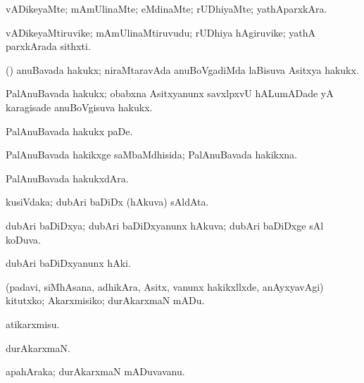 {{{\bentry
{} 
\gl{\kirxvi}
\expl{}
\bmng
vADikeyaMte; mAmUlinaMte; eMdinaMte; rUDhiyaMte; yathAparxkAra. 
\emng
\eentry

\bentry
{} 
\gl{\nA}
\expl{}
\bmng
vADikeyaMtiruvike; mAmUlinaMtiruvudu; rUDhiya hAgiruvike; yathA parxkArada sithxti. 
\emng
\eentry

\bentry
{} 
\gl{\nA}
\expl{}
\bmng
{} 
\emng
\eentry

\bentry
{} 
\gl{\nA}
\expl{}
\bmng
(\nAyxshA) anuBavada hakukx; niraMtaravAda anuBoVgadiMda laBisuva Asitxya hakukx. 
\emng
\eentry

\bentry
{} 
\gl{\nA}
\expl{}
\bmng
PalAnuBavada hakukx; obabxna Asitxyanunx savxlpxvU hALumADade yA karagisade anuBoVgisuva hakukx. 
\emng
\eentry

\bentry
{} 
\gl{\sakirx}
\expl{}
\bmng
PalAnuBavada hakukx paDe. 
\emng
\eentry

\bentry
{} 
\gl{\gu}
\expl{}
\bmng
PalAnuBavada hakikxge saMbaMdhisida; PalAnuBavada hakikxna. 
\emng
\eentry

\bentry
{} 
\gl{\nA}
\expl{}
\bmng
PalAnuBavada hakukxdAra. 
\emng
\eentry

\bentry
{} 
\gl{\nA}
\expl{}
\bmng
kusiVdaka; dubAri baDiDx (hAkuva) sAldAta. 
\emng
\eentry

\bentry
{} 
\gl{\gu}
\expl{}
\bmng
dubAri baDiDxya; dubAri baDiDxyanunx hAkuva; dubAri baDiDxge sAl koDuva. 
\emng
\eentry

\bentry
{} 
\gl{\kirxvi}
\expl{}
\bmng
dubAri baDiDxyanunx hAki. 
\emng
\eentry

\bentry
{} 
\gl{\akirx}
\expl{}
\bmng
(padavi, siMhAsana, adhikAra, Asitx, \mo vanunx hakikxllxde, anAyxyavAgi) kitutxko; Akarxmisiko; durAkarxmaN mADu. 
\emng

\noindent 
\gl{\akirx}
\expl{}
\bmng
atikarxmisu. 
\emng
\eentry

\bentry
{} 
\gl{\nA}
\expl{}
\bmng
durAkarxmaN. 
\emng
\eentry

\bentry
{} 
\gl{\nA}
\expl{}
\bmng
apahAraka; durAkarxmaN mADuvavanu. 
\emng
\eentry

}}}
